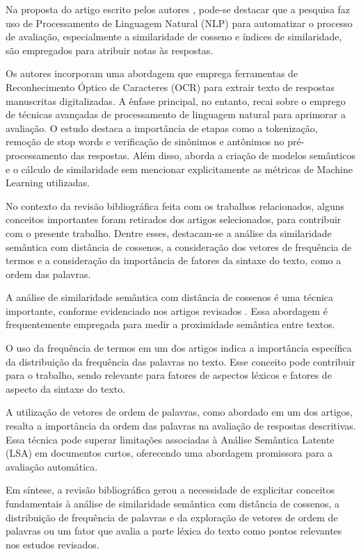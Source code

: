 Na proposta do artigo escrito pelos autores \textcite{SemanticSimilarityBasedDescriptiveAnswerEvaluation}, pode-se destacar que a pesquisa faz uso de Processamento de Linguagem Natural (NLP) para automatizar o processo de avaliação, especialmente a similaridade de cosseno e índices de similaridade, são empregados para atribuir notas às respostas.

Os autores \textcite{StudyAutomatedEvaluationStudentsExaminationPaperMachineLearningTechniques} incorporam uma abordagem que emprega ferramentas de Reconhecimento Óptico de Caracteres (OCR) para extrair texto de respostas manuscritas digitalizadas. A ênfase principal, no entanto, recai sobre o emprego de técnicas avançadas de processamento de linguagem natural para aprimorar a avaliação. O estudo destaca a importância de etapas como a tokenização, remoção de stop words e verificação de sinônimos e antônimos no pré-processamento das respostas. Além disso, aborda a criação de modelos semânticos e o cálculo de similaridade sem mencionar explicitamente as métricas de Machine Learning utilizadas.

No contexto da revisão bibliográfica feita com os trabalhos relacionados, alguns conceitos importantes foram retirados dos artigos selecionados, para contribuir com o presente trabalho. Dentre esses, destacam-se a análise da similaridade semântica com distância de cossenos, a consideração dos vetores de frequência de termos e a consideração da importância de fatores da sintaxe do texto, como a ordem das palavras.

A análise de similaridade semântica com distância de cossenos é uma técnica importante, conforme evidenciado nos artigos revisados \cite{SemanticSimilarityBasedDescriptiveAnswerEvaluation}. Essa abordagem é frequentemente empregada para medir a proximidade semântica entre textos.

O uso da frequência de termos em um dos artigos indica a importância específica da distribuição da frequência das palavras no texto. Esse conceito pode contribuir para o trabalho, sendo relevante para fatores de aspectos léxicos e fatores de aspecto da sintaxe do texto.

A utilização de vetores de ordem de palavras, como abordado em um dos artigos, resalta a importância da ordem das palavras na avaliação de respostas descritivas. Essa técnica pode superar limitações associadas à Análise Semântica Latente (LSA) em documentos curtos, oferecendo uma abordagem promissora para a avaliação automática.

Em síntese, a revisão bibliográfica gerou a necessidade de explicitar conceitos fundamentais à análise de similaridade semântica com distância de cossenos, a distribuição de frequência de palavras e da exploração de vetores de ordem de palavras ou um fator que avalia a parte léxica do texto como pontos relevantes nos estudos revisados.

\newpage